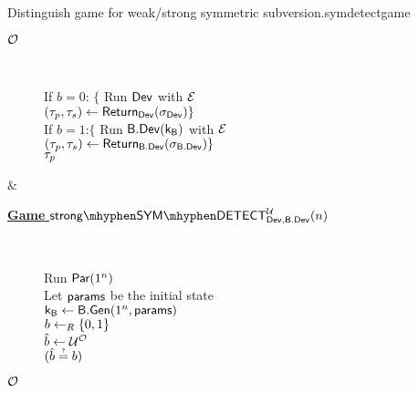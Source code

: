 \begin{defn}
\begin{enumerate}[1.]
\begin{boxfigTwo}{Distinguish game for weak/strong symmetric subversion.}{symdetectgame}
\begin{minipage}{0.45\textwidth}
\begin{description}
	\item[\underline{$\operatorname{\mathcal{O}}$}] ~
	
		If $b=0$: $\{$ Run $\operatorname{\mathsf{Dev}}$ with $\mathcal{E}$ \\
	    $(\tau_p,\tau_s)\leftarrow\operatorname{\mathsf{Return}}_{\operatorname{\mathsf{Dev}}}(\sigma_{\operatorname{\mathsf{Dev}}}) \}$ \\
		If $b=1$:$\{$ Run $\mathsf{B}.\mathsf{Dev}(\mathsf{k}_{\mathsf{B}})$ with $\mathcal{E}$ \\
		$(\tau_p,\tau_s)\leftarrow\operatorname{\mathsf{Return}}_{\mathsf{B}.\mathsf{Dev}}(\sigma_{\mathsf{B}.\mathsf{Dev}}) \}$ \\
		\Ret $\tau_p$
		\smallskip
  	\end{description}
\end{minipage}
    & 
\begin{minipage}{0.45\textwidth}
    \smallskip
	\begin{description}
 	\item[\underline{\textbf{Game} $\symstrongdetect{\dev}{\bbdev}{\user}$}] ~
 	
 	 	Run $\operatorname{\mathsf{Par}}(1^n)$ \\
 	 	Let $\mathsf{params}$ be the initial state \\
 		$\mathsf{k}_{\mathsf{B}}\leftarrow \mathsf{B}.\mathsf{Gen}(1^n,\mathsf{params})$ \\
 		$b\leftarrow_R \{0,1\}$ \\
 		$\hat{b}\leftarrow \mathcal{U}^{\operatorname{\mathcal{O}}}$ \\
 		\Ret $\askequal{\hat{b}}{b}$

	\item[\underline{$\operatorname{\mathcal{O}}$}] ~
	

\end{description}
\end{minipage}
\end{boxfigTwo}
\end{enumerate}
\end{defn}
